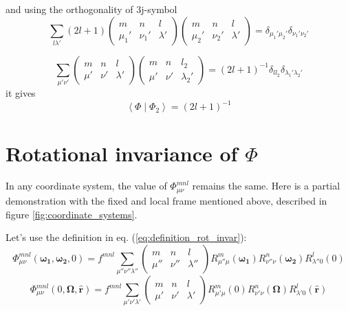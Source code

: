 and using the orthogonality of 3j-symbol \citep{Edmonds}
\begin{equation}
\sum_{l\lambda'}\left(2l+1\right)\left(\begin{array}{ccc}
m & n & l\\
\mu_{1}' & \nu_{1}' & \lambda'
\end{array}\right)\left(\begin{array}{ccc}
m & n & l\\
\mu_{2}' & \nu_{2}' & \lambda'
\end{array}\right)=\delta_{\mu_{1}'\mu_{2}'}\delta_{\nu_{1}'\nu_{2}'}
\end{equation}


\begin{equation}
\sum_{\mu'\nu'}\left(\begin{array}{ccc}
m & n & l\\
\mu' & \nu' & \lambda'
\end{array}\right)\left(\begin{array}{ccc}
m & n & l_{2}\\
\mu' & \nu' & \lambda_{2}'
\end{array}\right)=\left(2l+1\right)^{-1}\delta_{ll_{2}}\delta_{\lambda_{1}'\lambda_{2}'}
\end{equation}
it gives
\begin{equation}
\left\langle \Phi\mid\Phi_{2}\right\rangle =\left(2l+1\right)^{-1}
\end{equation}



\section{Rotational invariance of $\Phi$}

In any coordinate system, the value of $\Phi_{\mu\nu}^{mnl}$ remains
the same. Here is a partial demonstration with the fixed and local
frame mentioned above, described in figure \ref{fig:coordinate_systems}.

Let's use the definition in eq. (\ref{eq:definition_rot_invar}):
\begin{equation}
\Phi_{\mu\nu}^{mnl}(\boldsymbol{\omega_{1}},\boldsymbol{\omega_{2}},0)=f^{mnl}\sum_{\mu''\nu''\lambda''}\left(\begin{array}{ccc}
m & n & l\\
\mu'' & \nu'' & \lambda''
\end{array}\right)R_{\mu''\mu}^{m}(\boldsymbol{\omega_{1}})R_{\nu''\nu}^{n}(\boldsymbol{\omega_{2}})R_{\lambda''0}^{l}(0)
\end{equation}
\begin{equation}
\Phi_{\mu\nu}^{mnl}(0,\mathbf{\Omega},\mathbf{\hat{r}})=f^{mnl}\sum_{\mu'\nu'\lambda'}\left(\begin{array}{ccc}
m & n & l\\
\mu' & \nu' & \lambda'
\end{array}\right)R_{\mu'\mu}^{m}(0)R_{\nu'\nu}^{n}(\mathbf{\Omega})R_{\lambda'0}^{l}(\mathbf{\hat{r}})
\end{equation}


